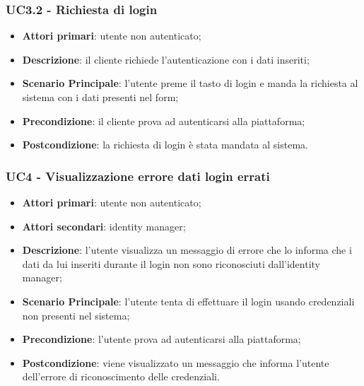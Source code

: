 \subsubsection{UC3.2 - Richiesta di login}
\begin{itemize}
\item \textbf{Attori primari}: utente non autenticato;
\item \textbf{Descrizione}: il cliente richiede l'autenticazione con i dati inseriti;
\item \textbf{Scenario Principale}: l'utente preme il tasto di login e manda la richiesta al sistema con i dati presenti nel form;
\item \textbf{Precondizione}: il cliente prova ad autenticarsi alla piattaforma;
\item \textbf{Postcondizione}: la richiesta di login è stata mandata al sistema.
\end{itemize} 

\subsubsection{UC4 - Visualizzazione errore dati login errati}
\begin{itemize}
\item \textbf{Attori primari}: utente non autenticato;
\item \textbf{Attori secondari}: identity manager;
\item \textbf{Descrizione}: l'utente visualizza un messaggio di errore che lo informa che i dati da lui inseriti durante il login non sono riconosciuti dall'identity manager;
\item \textbf{Scenario Principale}: l'utente tenta di effettuare il login usando credenziali non presenti nel sistema;
\item \textbf{Precondizione}: l'utente prova ad autenticarsi alla piattaforma;
\item \textbf{Postcondizione}: viene visualizzato un messaggio che informa l'utente dell'errore di riconoscimento delle credenziali.
\end{itemize}